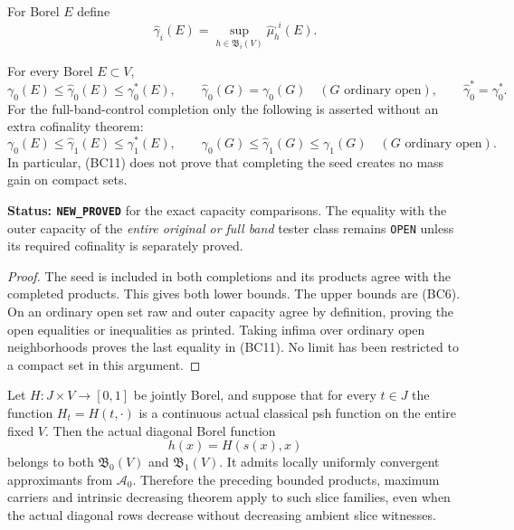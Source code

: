 For Borel $E$ define
\[
                \widehat\gamma_i(E)
                  =\sup_{h\in\mathfrak B_i(V)}\widehat\mu_h^{,i}(E).
 \tag{BC10}
\]
\begin{theorem}
\label{thm:r12-band-completion-outer-capacity}
For every Borel $E\subset V$,
\[
 \gamma_0(E)\leq\widehat\gamma_0(E)\leq\gamma_0^*(E),
 \qquad
 \widehat\gamma_0(G)=\gamma_0(G)\quad(G\text{ ordinary open}),
 \qquad
 \widehat\gamma_0^*=\gamma_0^*.
 \tag{BC11}
\]
For the full-band-control completion only the following is
asserted without an extra cofinality theorem:
\[
 \gamma_0(E)\leq\widehat\gamma_1(E)\leq\gamma_1^*(E),
 \qquad
 \gamma_0(G)\leq\widehat\gamma_1(G)\leq\gamma_1(G)
                       \quad(G\text{ ordinary open}).
 \tag{BC12}
\]
In particular, (BC11) does not prove that completing the seed
creates no mass gain on compact sets.
\end{theorem}

\noindent\textbf{Status: \texttt{NEW\_PROVED}} for the exact
capacity comparisons. The equality with the outer capacity of
the \emph{entire original or full band} tester class remains
\texttt{OPEN} unless its required cofinality is separately proved.

\begin{proof}
The seed is included in both completions and its products agree
with the completed products. This gives both lower bounds.
The upper bounds are (BC6). On an ordinary open set raw and
outer capacity agree by definition, proving the open equalities
or inequalities as printed. Taking infima over ordinary open
neighborhoods proves the last equality in (BC11). No limit has
been restricted to a compact set in this argument.
\end{proof}

\begin{proposition}
\label{prop:r12-continuous-slice-completion}
Let $H:J\times V\to[0,1]$ be jointly Borel, and suppose that
for every $t\in J$ the function $H_t=H(t,\cdot)$ is a
continuous actual classical psh function on the entire fixed
$V$. Then the actual diagonal Borel function
\[
                                h(x)=H(s(x),x)
 \tag{BC13}
\]
belongs to both $\mathfrak B_0(V)$ and $\mathfrak B_1(V)$.
It admits locally uniformly convergent approximants from
$\mathcal A_0$. Therefore the preceding bounded products,
maximum carriers and intrinsic decreasing theorem apply to
such slice families, even when the actual diagonal rows
decrease without decreasing ambient slice witnesses.
\end{proposition}

